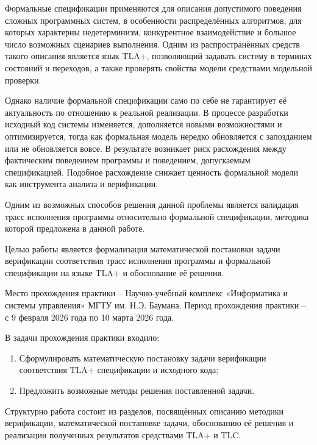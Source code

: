 \introduction

Формальные спецификации применяются для описания допустимого поведения сложных
программных систем, в особенности распределённых алгоритмов, для которых
характерны недетерминизм, конкурентное взаимодействие и большое число
возможных сценариев выполнения. Одним из распространённых средств такого
описания является язык TLA+, позволяющий задавать систему в терминах состояний
и переходов, а также проверять свойства модели средствами модельной проверки.

Однако наличие формальной спецификации само по себе не гарантирует её
актуальность по отношению к реальной реализации. В процессе разработки
исходный код системы изменяется, дополняется новыми возможностями и
оптимизируется, тогда как формальная модель нередко обновляется с запозданием
или не обновляется вовсе. В результате возникает риск расхождения между
фактическим поведением программы и поведением, допускаемым спецификацией.
Подобное расхождение снижает ценность формальной модели как инструмента
анализа и верификации.

Одним из возможных способов решения данной проблемы является валидация трасс
исполнения программы относительно формальной спецификации, методика которой
предложена в данной работе.

Целью работы является формализация математической постановки задачи верификации
соответствия трасс исполнения программы и формальной спецификации на языке TLA+
и обоснование её решения.

Место прохождения практики – Научно-учебный комплекс «Информатика и системы
управления» МГТУ им. Н.Э. Баумана. Период прохождения практики – с 9 февраля
2026 года по 10 марта 2026 года.

В задачи прохождения практики входило:

\begin{enumerate}[leftmargin=0pt,itemindent=4.6em]
    \item Сформулировать математическую постановку задачи верификации
    соответствия TLA+ спецификации и исходного кода;
    \item Предложить возможные методы решения поставленной задачи.
\end{enumerate}

Структурно работа состоит из разделов, посвящённых описанию методики
верификации, математической постановке задачи, обоснованию её решения и
реализации полученных результатов средствами TLA+ и TLC.
